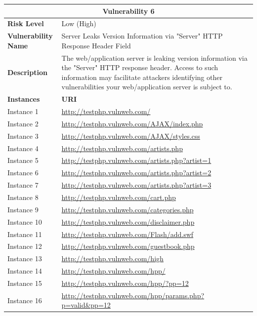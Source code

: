 \documentclass[12pt]{article}
\begin{document}
\begin{center}
\renewcommand{\arraystretch}{1.3}
\begin{longtable}{|l|p{10cm}|}
\hline
\multicolumn{2}{|c|}{\textbf{Vulnerability 6}} \\
\hline
\textbf{Risk Level} & Low (High) \\
\hline
\textbf{Vulnerability Name} & Server Leaks Version Information via "Server" HTTP Response Header Field \\
\hline
\textbf{Description} & The web/application server is leaking version information via the "Server" HTTP response header. Access to such information may facilitate attackers identifying other vulnerabilities your web/application server is subject to. \\
\hline
\textbf{Instances} & \textbf{URI} \\
\hline
Instance 1 & \url{http://testphp.vulnweb.com/} \\
\hline
Instance 2 & \url{http://testphp.vulnweb.com/AJAX/index.php} \\
\hline
Instance 3 & \url{http://testphp.vulnweb.com/AJAX/styles.css} \\
\hline
Instance 4 & \url{http://testphp.vulnweb.com/artists.php} \\
\hline
Instance 5 & \url{http://testphp.vulnweb.com/artists.php?artist=1} \\
\hline
Instance 6 & \url{http://testphp.vulnweb.com/artists.php?artist=2} \\
\hline
Instance 7 & \url{http://testphp.vulnweb.com/artists.php?artist=3} \\
\hline
Instance 8 & \url{http://testphp.vulnweb.com/cart.php} \\
\hline
Instance 9 & \url{http://testphp.vulnweb.com/categories.php} \\
\hline
Instance 10 & \url{http://testphp.vulnweb.com/disclaimer.php} \\
\hline
Instance 11 & \url{http://testphp.vulnweb.com/Flash/add.swf} \\
\hline
Instance 12 & \url{http://testphp.vulnweb.com/guestbook.php} \\
\hline
Instance 13 & \url{http://testphp.vulnweb.com/high} \\
\hline
Instance 14 & \url{http://testphp.vulnweb.com/hpp/} \\
\hline
Instance 15 & \url{http://testphp.vulnweb.com/hpp/?pp=12} \\
\hline
Instance 16 & \url{http://testphp.vulnweb.com/hpp/params.php?p=valid\&pp=12} \\

\end{longtable}
\end{center}
\end{document}
